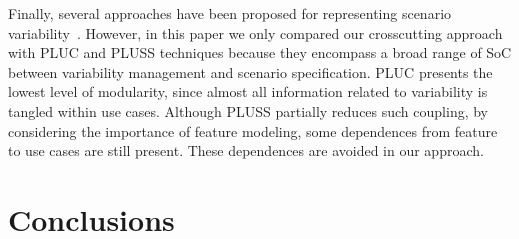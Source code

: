 \documentclass[11pt]{report}
\begin{document}
Finally, several approaches have been proposed for representing 
scenario variability~\cite{jacobson-reuse-book, favaro-icsr-98, eriksson-splc-2005,bertolino-esec-2003}. 
However, in this paper we only compared our crosscutting approach with PLUC and 
PLUSS techniques because they encompass a broad range of SoC between 
variability management and scenario specification. PLUC presents the lowest level of 
modularity, since almost all information related to variability is tangled within use 
cases. Although PLUSS partially reduces such coupling, by considering the 
importance of feature modeling, some dependences from feature to use cases are
still present. These dependences are avoided in our approach.


%

\chapter{Conclusions}\label{sec:conclusions}
\end{document}
